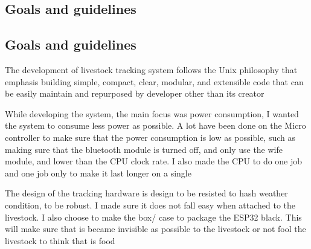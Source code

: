 \subsection{Goals and guidelines}
\subsection{Goals and guidelines}

The development of livestock tracking system follows the Unix philosophy that
emphasis building simple, compact, clear, modular, and extensible code that can
be easily maintain and repurposed by developer other than its creator

While developing the system, the main focus was power consumption, I wanted the
system to consume less power as possible. A lot have been done on the Micro controller
to make sure that the power consumption is low as possible, such as making sure that the bluetooth
module is turned off, and only use the wife module, and lower than the CPU clock rate.
I also made the CPU to do one job and one job only to make it last longer on a single

The design of the tracking hardware is design to be resisted to hash weather condition, to be
robust. I made sure it does not fall easy when attached to the livestock. I also choose to make the
box/ case to package the ESP32 black. This will make sure that is became invisible as possible to the
livestock or not fool the livestock to think that is food
